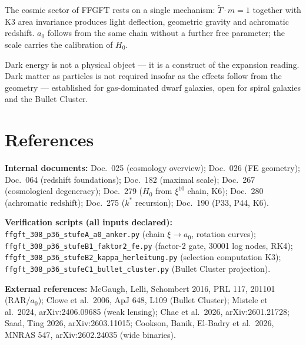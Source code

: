 \medskip
The cosmic sector of FFGFT rests on a single mechanism: $\tilde T \cdot
m = 1$ together with K3 area invariance produces light deflection,
geometric gravity and achromatic redshift. $a_0$ follows from the same
chain without a further free parameter; the scale carries the calibration
of $H_0$.

Dark energy is not a physical object — it is a construct of the expansion
reading. Dark matter as particles is not required insofar as the effects follow
from the geometry --- established for gas-dominated dwarf galaxies, open for
spiral galaxies and the Bullet Cluster.

\chapter{References}

\textbf{Internal documents:}
Doc.~025 (cosmology overview);
Doc.~026 (FE geometry);
Doc.~064 (redshift foundations);
Doc.~182 (maximal scale);
Doc.~267 (cosmological degeneracy);
Doc.~279 ($H_0$ from $\xi^{10}$ chain, K6);
Doc.~280 (achromatic redshift);
Doc.~275 ($k^*$ recursion);
Doc.~190 (P33, P44, K6).

\medskip
\noindent\textbf{Verification scripts (all inputs declared):}
\texttt{ffgft\_308\_p36\_stufeA\_a0\_anker.py}
(chain $\xi \to a_0$, rotation curves);
\texttt{ffgft\_308\_p36\_stufeB1\_faktor2\_fe.py}
(factor-2 gate, 30001 log nodes, RK4);
\texttt{ffgft\_308\_p36\_stufeB2\_kappa\_herleitung.py}
(selection computation K3);
\texttt{ffgft\_308\_p36\_stufeC1\_bullet\_cluster.py}
(Bullet Cluster projection).

\medskip
\noindent\textbf{External references:}
McGaugh, Lelli, Schombert 2016, PRL 117, 201101 (RAR/$a_0$);
Clowe et al.\ 2006, ApJ 648, L109 (Bullet Cluster);
Mistele et al.\ 2024, arXiv:2406.09685 (weak lensing);
Chae et al.\ 2026, arXiv:2601.21728; Saad, Ting 2026, arXiv:2603.11015;
Cookson, Banik, El-Badry et al.\ 2026, MNRAS 547, arXiv:2602.24035
(wide binaries).
